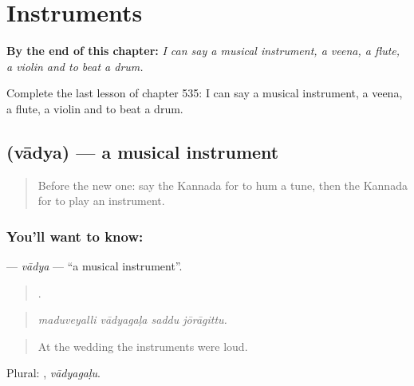 
\chapter{Instruments}
\label{ch:ka-instruments}

\begin{chapteropening}
\textbf{By the end of this chapter:} \emph{I can say a musical instrument, a veena, a flute, a violin and to beat a drum.}

Complete the last lesson of chapter 535: I can say a musical instrument, a veena, a flute, a violin and to beat a drum.
\end{chapteropening}

\section[\texorpdfstring{\kn{ವಾದ್ಯ} (vādya)}{ವಾದ್ಯ (vādya)}]{ (vādya) — a musical instrument}

\label{lesson:KA-C535-vadya}



\begin{quote}
Before the new one: say the Kannada for to hum a tune, then the Kannada for to play an instrument.
\end{quote}

\subsection*{You'll want to know: }
\textbf{} — \emph{vādya} — \textquotedblleft{}a musical instrument\textquotedblright{}.

\begin{quote}
   .
\end{quote}

\begin{quote}
\emph{maduveyalli vādyagaḷa saddu jōrāgittu.}
\end{quote}

\begin{quote}
At the wedding the instruments were loud.
\end{quote}

Plural: , \emph{vādyagaḷu}.

